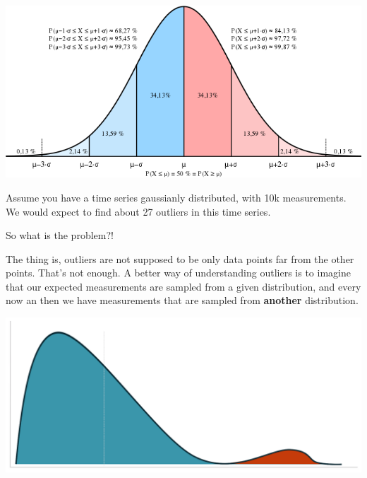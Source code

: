 \documentclass[
  letterpaper,
  DIV=11,
  numbers=noendperiod,
  oneside]{scrreprt}
\begin{document}
\includegraphics{outliers/Normal_Distribution_Sigma.png}


Assume you have a time series gaussianly distributed, with 10k
measurements. We would expect to find about 27 outliers in this time
series.

So what is the problem?!

The thing is, outliers are not supposed to be only data points far from
the other points. That's not enough. A better way of understanding
outliers is to imagine that our expected measurements are sampled from a
given distribution, and every now an then we have measurements that are
sampled from \textbf{another} distribution.

\includegraphics{outliers/two-distributions.png}

\end{document}
